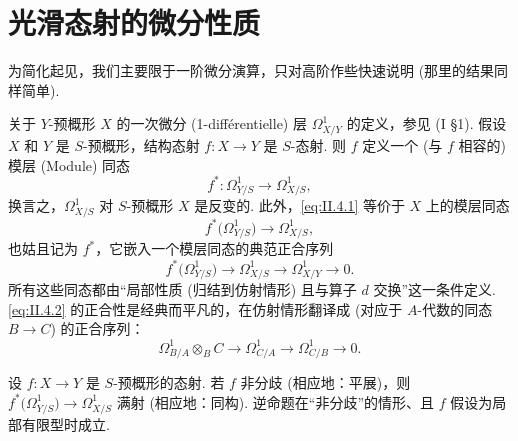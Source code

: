 \section{光滑态射的微分性质}

为简化起见，我们主要限于一阶微分演算，只对高阶作些快速说明 (那里的结果同样简单).

关于 $Y$-预概形 $X$ 的一次微分 (1-différentielle) 层 $\varOmega_{X/Y}^{1}$ 的定义，参见 (I §1). 假设 $X$ 和 $Y$ 是 $S$-预概形，结构态射 $f \colon X \to Y$ 是 $S$-态射. 则 $f$ 定义一个 (与 $f$ 相容的) 模层 (Module) 同态
\begin{equation}
f^{*} \colon \varOmega_{Y/S}^{1} \longrightarrow \varOmega_{X/S}^{1}, \tag{4.1}
\label{eq:II.4.1}
\end{equation}
换言之，$\varOmega_{X/S}^{1}$ 对 $S$-预概形 $X$ 是反变的. 此外，\eqref{eq:II.4.1} 等价于 $X$ 上的模层同态
\begin{equation}
f^{*}\bigl(\varOmega_{Y/S}^{1}\bigr) \longrightarrow \varOmega_{X/S}^{1}, \tag{4.1bis}
\label{eq:II.4.1bis}
\end{equation}
也姑且记为 $f^{*}$，它嵌入一个模层同态的典范正合序列
\begin{equation}
f^{*}\bigl(\varOmega_{Y/S}^{1}\bigr) \longrightarrow \varOmega_{X/S}^{1} \longrightarrow \varOmega_{X/Y}^{1} \longrightarrow 0. \tag{4.2}
\label{eq:II.4.2}
\end{equation}
所有这些同态都由``局部性质 (归结到仿射情形) 且与算子 $d$ 交换''这一条件定义. \eqref{eq:II.4.2} 的正合性是经典而平凡的，在仿射情形翻译成 (对应于 $A$-代数的同态 $B \to C$) 的正合序列：
\begin{equation}
\varOmega_{B/A}^{1} \otimes_B C \longrightarrow \varOmega_{C/A}^{1} \longrightarrow \varOmega_{C/B}^{1} \longrightarrow 0. \tag{4.2bis}
\label{eq:II.4.2bis}
\end{equation}

\begin{lemma}\label{lem:II.4.1}
设 $f \colon X \to Y$ 是 $S$-预概形的态射. 若 $f$ 非分歧 (相应地：平展)，则 $f^{*}\bigl(\varOmega_{Y/S}^{1}\bigr) \to \varOmega_{X/S}^{1}$ 满射 (相应地：同构). 逆命题在``非分歧''的情形、且 $f$ 假设为局部有限型时成立.
\end{lemma}

